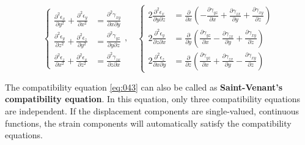 \documentclass[en,hazy,cyan,8pt,normal]{elegantnote}
\numberwithin{equation}{section}
\begin{document}
    \begin{equation}\label{eq:043}
      \left\{
      \begin{aligned}
        \frac{\partial^2 \epsilon_x}{\partial y^2} + \frac{\partial^2 \epsilon_y}{\partial x^2} &= \frac{\partial^2 \gamma_{xy}}{\partial x \partial y} \\
        \frac{\partial^2 \epsilon_y}{\partial z^2} + \frac{\partial^2 \epsilon_z}{\partial y^2} &= \frac{\partial^2 \gamma_{yz}}{\partial y \partial z} \\
        \frac{\partial^2 \epsilon_z}{\partial x^2} + \frac{\partial^2 \epsilon_x}{\partial z^2} &= \frac{\partial^2 \gamma_{zx}}{\partial z \partial x}
      \end{aligned}
      \right.
      , \quad
      \left\{
      \begin{aligned}
        2 \frac{\partial^2 \epsilon_x}{\partial y \partial z} &= \frac{\partial}{\partial x} \left( -\frac{\partial \gamma_{yz}}{\partial x} + \frac{\partial \gamma_{zx}}{\partial y} + \frac{\partial \gamma_{xy}}{\partial z} \right) \\
        2 \frac{\partial^2 \epsilon_y}{\partial z \partial x} &= \frac{\partial}{\partial y} \left( \frac{\partial \gamma_{yz}}{\partial x} - \frac{\partial \gamma_{zx}}{\partial y} + \frac{\partial \gamma_{xy}}{\partial z} \right) \\
        2 \frac{\partial^2 \epsilon_z}{\partial x \partial y} &= \frac{\partial}{\partial z} \left( \frac{\partial \gamma_{yz}}{\partial x} + \frac{\partial \gamma_{zx}}{\partial y} - \frac{\partial \gamma_{xy}}{\partial z} \right)
      \end{aligned}
      \right.
    \end{equation}

    The compatibility equation \cref{eq:043} can also be called as \textbf{Saint-Venant's compatibility equation}. In this equation, only three compatibility equations are independent. If the displacement components are single-valued, continuous functions, the strain components will automatically satisfy the compatibility equations.\\
\end{document}
